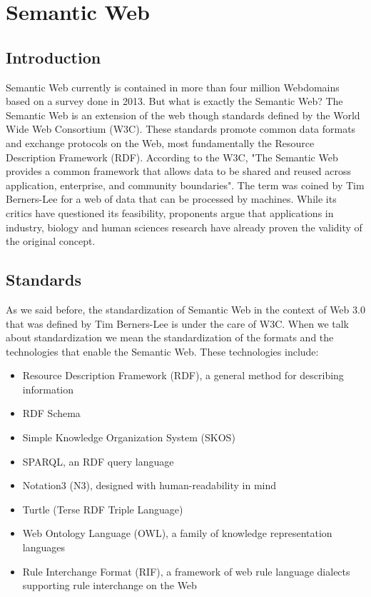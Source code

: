 \section*{Semantic Web}

\subsection*{Introduction}
Semantic Web currently is contained in more than four million Webdomains based on a survey done in 2013. But what is exactly the Semantic Web?
The Semantic Web is an extension of the web though standards defined by the World Wide Web Consortium (W3C). These standards promote common data formats and exchange protocols on the Web, most fundamentally the Resource Description Framework (RDF).
According to the W3C, "The Semantic Web provides a common framework that allows data to be shared and reused across application, enterprise, and community boundaries". The term was coined by Tim Berners-Lee for a web of data that can be processed by machines. While its critics have questioned its feasibility, proponents argue that applications in industry, biology and human sciences research have already proven the validity of the original concept.

\subsection*{Standards}
As we said before, the standardization of Semantic Web in the context of Web 3.0 that was defined by Tim Berners-Lee is under the care of W3C. When we talk about standardization we mean the standardization of the formats and the technologies that enable the Semantic Web.
These technologies include:

\begin{itemize}
  \item Resource Description Framework (RDF), a general method for describing information
  \item RDF Schema
  \item Simple Knowledge Organization System (SKOS)
  \item SPARQL, an RDF query language
  \item Notation3 (N3), designed with human-readability in mind
  \item Turtle (Terse RDF Triple Language)
  \item Web Ontology Language (OWL), a family of knowledge representation languages
  \item Rule Interchange Format (RIF), a framework of web rule language dialects supporting rule interchange on the Web
\end{itemize}

